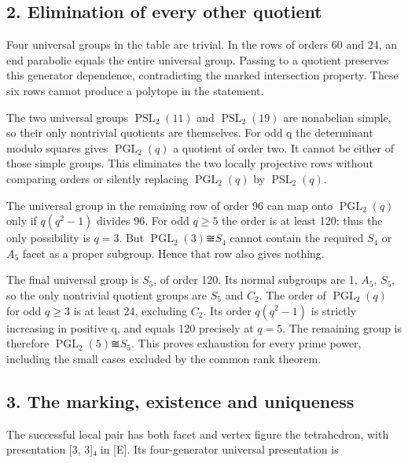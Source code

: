\documentclass[
  11pt,
  a4paper,
]{article}
\begin{document}
\subsection{2. Elimination of every other
quotient}\label{elimination-of-every-other-quotient}

Four universal groups in the table are trivial. In the rows of orders 60
and 24, an end parabolic equals the entire universal group. Passing to a
quotient preserves this generator dependence, contradicting the marked
intersection property. These six rows cannot produce a polytope in the
statement.

The two universal groups \(\operatorname{PSL}_2(11)\) and
\(\operatorname{PSL}_2(19)\) are nonabelian simple, so their only
nontrivial quotients are themselves. For odd q the determinant modulo
squares gives \(\operatorname{PGL}_2(q)\) a quotient of order two. It
cannot be either of those simple groups. This eliminates the two locally
projective rows without comparing orders or silently replacing
\(\operatorname{PGL}_2(q)\) by \(\operatorname{PSL}_2(q)\).

The universal group in the remaining row of order 96 can map onto
\(\operatorname{PGL}_2(q)\) only if \(q(q^2-1)\) divides 96. For odd
\(q\ge 5\) the order is at least 120; thus the only possibility is
\(q=3\). But \(\operatorname{PGL}_2(3)\)≅\(S_4\) cannot contain the
required \(S_4\) or \(A_5\) facet as a proper subgroup. Hence that row
also gives nothing.

The final universal group is \(S_5\), of order 120. Its normal subgroups
are 1, \(A_5\), \(S_5\), so the only nontrivial quotient groups are
\(S_5\) and \(C_2\). The order of \(\operatorname{PGL}_2(q)\) for odd
\(q\ge 3\) is at least 24, excluding \(C_2\). Its order \(q(q^2-1)\) is
strictly increasing in positive q, and equals 120 precisely at \(q=5\).
The remaining group is therefore \(\operatorname{PGL}_2(5)\)≅\(S_5\).
This proves exhaustion for every prime power, including the small cases
excluded by the common rank theorem.

\subsection{3. The marking, existence and
uniqueness}\label{the-marking-existence-and-uniqueness}

The successful local pair has both facet and vertex figure the
tetrahedron, with presentation {[}3, 3{]}₄ in {[}E{]}. Its
four-generator universal presentation is
\end{document}
